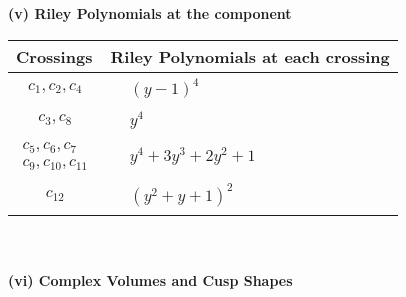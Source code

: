 \documentclass[1p]{elsarticle_modified}
\theoremstyle{definition}
\begin{document}
\newpage\renewcommand{\arraystretch}{1}
\flushleft \textbf{(v) Riley Polynomials at the component}\newline \\
\begin{tabular}{m{50pt}|m{274pt}}
Crossings & \hspace{64pt}Riley Polynomials at each crossing \\
\hline $$\begin{aligned}c_{1},c_{2},c_{4}\end{aligned}$$&$\begin{aligned}
&(y-1)^4
\end{aligned}$\\
\hline $$\begin{aligned}c_{3},c_{8}\end{aligned}$$&$\begin{aligned}
&y^4
\end{aligned}$\\
\hline $$\begin{aligned}c_{5},c_{6},c_{7}\\c_{9},c_{10},c_{11}\end{aligned}$$&$\begin{aligned}
&y^4+3 y^3+2 y^2+1
\end{aligned}$\\
\hline $$\begin{aligned}c_{12}\end{aligned}$$&$\begin{aligned}
&(y^2+y+1)^2
\end{aligned}$\\
\hline
\end{tabular}\\~\\
\newpage\flushleft \textbf{(vi) Complex Volumes and Cusp Shapes}
\end{document}
